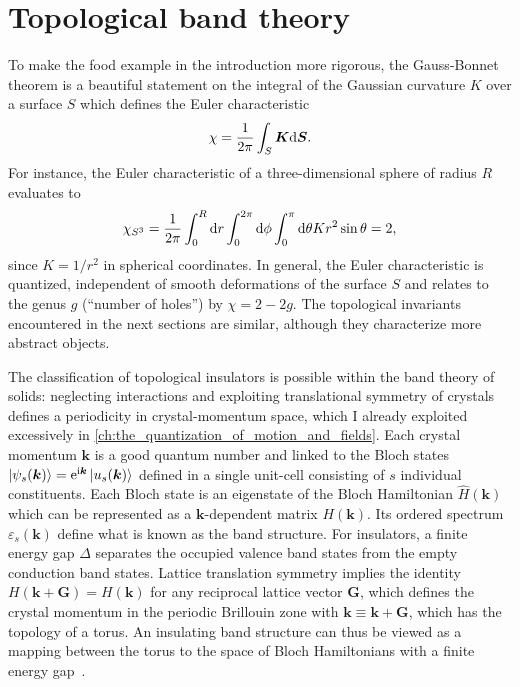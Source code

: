 \section{Topological band theory}
\label{sec:topological_band_theory}
%
%
To make the food example in the introduction more rigorous, the Gauss-Bonnet theorem is a beautiful statement on the integral of the Gaussian curvature $K$ over a surface $S$ which defines the Euler characteristic~\cite{Nakahara1990}
\begin{align}
    \chi = \frac1{2\pi}\int_S {\bm K}\mathrm d {\bm S}.
\end{align}
For instance, the Euler characteristic of a three-dimensional sphere of radius $R$ evaluates to
\begin{align}
    \chi_{S^3} = \frac1{2\pi}\int_0^R\mathrm d r\int_0^{2\pi}\mathrm d\phi \int_0^\pi\mathrm d\theta K r^2\sin\theta = 2,
\end{align}
since $K=1/r^2$ in spherical coordinates.
In general, the Euler characteristic is quantized, independent of smooth deformations of the surface $S$ and relates to the genus $g$ (``number of holes'') by $\chi=2-2g$.
The topological invariants encountered in the next sections are similar, although they characterize more abstract objects.

The classification of topological insulators is possible within the band theory of solids: neglecting interactions and exploiting translational symmetry of crystals defines a periodicity in crystal-momentum space, which I already exploited excessively in \cref{ch:the_quantization_of_motion_and_fields}.
Each crystal momentum ${\bm k}$ is a good quantum number and linked to the Bloch states $\ket{\psi_s(\bm k)}=\mathrm e^{\mathrm i\bm k}\ket{u_s(\bm k)}$ defined in a single unit-cell consisting of $s$ individual constituents.
Each Bloch state is an eigenstate of the Bloch Hamiltonian $\hat H(\bm k)$ which can be represented as a $\bm k$-dependent matrix $H(\bm k)$.
Its ordered spectrum $\varepsilon_s(\bm k)$ define what is known as the band structure.
For insulators, a finite energy gap $\Delta$ separates the occupied valence band states from the empty conduction band states.
Lattice translation symmetry implies the identity $H(\bm k + \bm G) = H(\bm k)$ for any reciprocal lattice vector $\bm G$, which defines the crystal momentum in the periodic Brillouin zone with $\bm k\equiv \bm k+\bm G$, which has the topology of a torus.
An insulating band structure can thus be viewed as a mapping between the torus to the space of Bloch Hamiltonians with a finite energy gap~\cite{Kane2013}.

